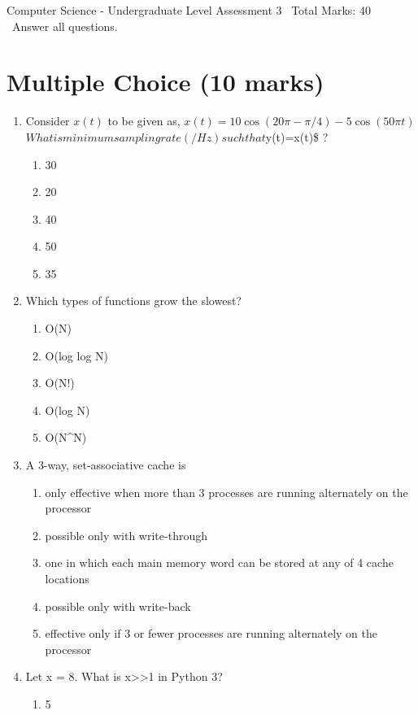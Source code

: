 \documentclass[12pt]{article}
\begin{document}
\begin{center}
Computer Science - Undergraduate Level Assessment 3 \
Total Marks: 40 \
Answer all questions.
\end{center}

\section*{Multiple Choice (10 marks)}
\begin{enumerate}[label=\arabic*.]
\item Consider $x(t)$ to be given as, $ x(t)=10 \cos (20 \pi-\pi / 4)-5 \cos (50 \pi t) $$ What
is minimum sampling rate (/Hz) such that $y(t)=x(t)\$ ?
\begin{enumerate}[label=(\alph*)]
    \item 30
    \item 20
    \item 40
    \item 50
    \item 35
\end{enumerate}
\item Which types of functions grow the slowest?
\begin{enumerate}[label=(\alph*)]
    \item O(N)
    \item O(log log N)
    \item O(N!)
    \item O(log N)
    \item O(N\^{}N)
\end{enumerate}
\item A 3-way, set-associative cache is
\begin{enumerate}[label=(\alph*)]
    \item only effective when more than 3 processes are running alternately on the processor
    \item possible only with write-through
    \item one in which each main memory word can be stored at any of 4 cache locations
    \item possible only with write-back
    \item effective only if 3 or fewer processes are running alternately on the processor
\end{enumerate}
\item Let x = 8. What is x\textgreater{}\textgreater{}1 in Python 3?
\begin{enumerate}[label=(\alph*)]
    \item 5

\end{enumerate}$$
\end{enumerate}
\end{document}
